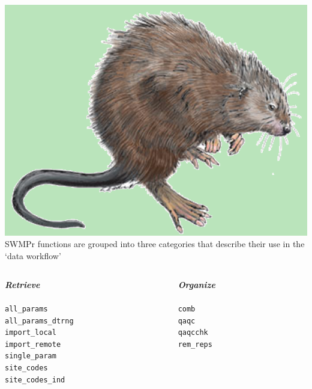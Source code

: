 \documentclass[serif]{beamer}\usepackage[]{graphicx}\usepackage[]{color}
\newcommand{\Bigtxt}[1]{\textbf{\textit{#1}}}
\begin{document}
\begin{frame}[fragile]{\includegraphics[width=0.05\paperwidth]{fig/muskrat.png}\hspace{0.07in}{\bf SWMPrats.net: The SWMPr package}}
SWMPr functions are grouped into three categories that describe their use in the `data workflow'
\vspace{-0.2in}
\begin{columns}[t]
\begin{column}{0.3\textwidth}
\begin{center}
\Bigtxt{Retrieve}\\~\\
\small{
\texttt{all\_params}\\
\texttt{all\_params_dtrng}\\
\texttt{import\_local}\\
\texttt{import\_remote}\\
\texttt{single\_param}\\
\texttt{site\_codes}\\
\texttt{site\_codes\_ind}
}
\end{center}
\end{column}
\begin{column}{0.3\textwidth}
\begin{center}
\Bigtxt{Organize}\\~\\
\small{
\texttt{comb}\\
\texttt{qaqc}\\
\texttt{qaqcchk}\\
\texttt{rem\_reps}\\
}
\end{center}
\end{column}
\end{columns}
\end{frame}
\end{document}
